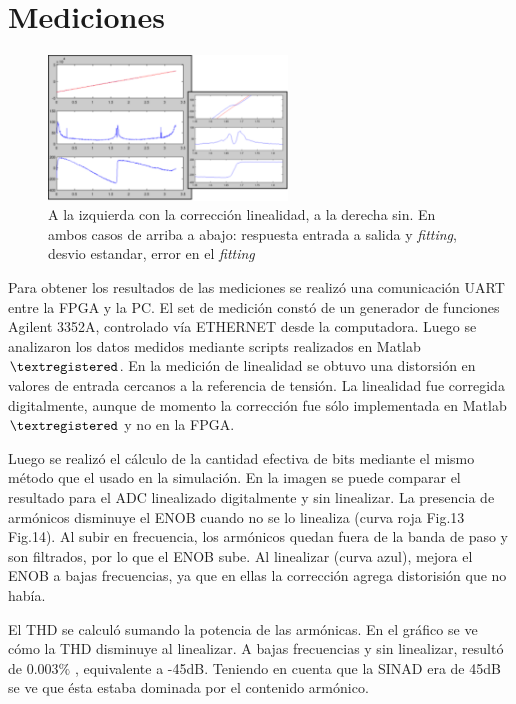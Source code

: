 \documentclass[a4paper,conference]{IEEEtran}
\begin{document}
\section{Mediciones}

\begin{figure}[!t]
\centering
\includegraphics[width=2.5in]{Medicion_Linealidad}
\caption{A la izquierda con la correcci\'on linealidad, a la derecha sin. En ambos casos de arriba a abajo: respuesta entrada a salida y \textit{fitting}, desvio estandar, error en el \textit{fitting}}
\label{fig_12}
\end{figure}

Para obtener los resultados de las mediciones se realiz\'o una comunicaci\'on UART entre la FPGA y la PC. El set de medici\'on const\'o de un generador de funciones Agilent 3352A, controlado v\'ia ETHERNET desde la computadora. Luego se analizaron los datos medidos mediante scripts realizados en Matlab$\textregistered$.
En la medici\'on de linealidad se obtuvo una distorsi\'on en valores de entrada cercanos a la referencia de tensi\'on. La linealidad fue corregida digitalmente, aunque de momento la corrección fue s\'olo implementada en Matlab$\textregistered$ y no en la FPGA.
 
Luego se realiz\'o el c\'alculo de la cantidad efectiva de bits mediante el mismo m\'etodo que el usado en la simulaci\'on. En la imagen se puede comparar el resultado para el ADC linealizado digitalmente y sin linealizar.
La presencia de arm\'onicos disminuye el ENOB cuando no se lo linealiza (curva roja Fig.13 Fig.14). Al subir en frecuencia, los arm\'onicos quedan fuera de la banda de paso y son filtrados, por lo que el ENOB sube. Al linealizar (curva azul), mejora el ENOB a bajas frecuencias, ya que en ellas la correcci\'on agrega distorisi\'on que no hab\'ia.

El THD se calcul\'o sumando la potencia de las arm\'onicas. En el gr\'afico se ve c\'omo la THD disminuye al linealizar. A bajas frecuencias y sin linealizar, result\'o de 0.003$\%$ , equivalente a -45dB. Teniendo en cuenta que la SINAD era de 45dB se ve que \'esta estaba dominada por el contenido arm\'onico.
\end{document}
